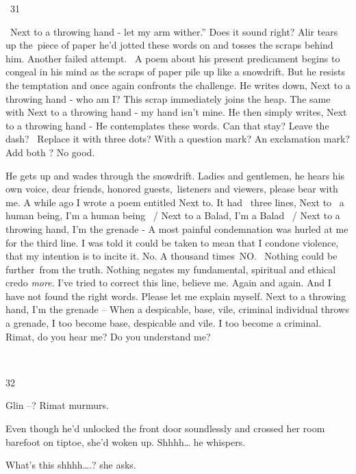 \documentclass[12pt]{book}
\begin{document}
\bigskip

~31

~{\textquotedbl}Next to a throwing hand - let my arm wither.'' Does it sound right? Alir tears up the~piece of paper
he'd jotted these words on{ }and tosses the scraps behind him. Another failed
attempt. \ A poem about his present predicament begins to congeal in his mind as the scraps of paper pile up like a
snowdrift. But he resists the temptation and once again confronts the challenge. He writes down, {\textquotedbl}Next to
a throwing hand - who am I?{\textquotedbl} This scrap immediately joins the heap. The same with {\textquotedbl}Next to
a throwing hand - my hand isn't mine.{\textquotedbl} He then simply{ }writes,
{\textquotedbl}Next to a throwing hand -{\textquotedbl} He contemplates these words. Can that stay? Leave the dash?
\ Replace it with three dots? With a question mark? An exclamation mark? Add both ? No good.

He gets up and wades through the snowdrift. {\textquotedbl}Ladies and gentlemen,{\textquotedbl} he hears his own voice,
{\textquotedbl}dear friends, honored guests,~listeners and viewers, please bear with me. A while ago I wrote a poem
entitled {\textquotedbl}Next to{\textquotedbl}. It had~ three lines, {\textquotedbl}Next to ~a human being, I'm a human
being ~/ Next to a Balad, I'm a Balad ~/ Next to a throwing hand, I'm the grenade -{\textquotedbl} A most
painful{ }condemnation was hurled at me for the third line. I was told it could be taken to mean that I
condone violence, that my intention is to incite it. No. A thousand times~NO. \ Nothing could be further~from the
truth. Nothing negates my fundamental, spiritual and ethical credo \textit{more}. I've tried to correct this line,
believe me. Again and again. And I have not found the right words. Please let me explain myself. {\textquotedbl}Next to
a throwing hand, I'm the grenade --{\textquotedbl} When a despicable, base, vile, criminal individual throws a grenade,
I too become base, despicable{ }and vile. I too become a criminal. Rimat, do
you hear me? Do you understand me?

~

32

{\textquotedbl}Glin --?{\textquotedbl} Rimat murmurs.

Even though he'd unlocked the front door soundlessly and crossed her room barefoot on tiptoe, she'd woken up.
{\textquotedbl}Shhhh{\dots}{\textquotedbl} he whispers.

{\textquotedbl}What's this shhhh{\dots}.?{\textquotedbl} she asks.
\end{document}
